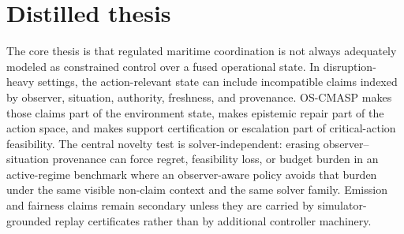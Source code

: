 \documentclass[11pt]{article}
\newcommand{\OSCMASP}{\mbox{\normalfont\textsc{OS-CMASP}}}
\newcommand{\1}{\mathbf{1}}
\theoremstyle{definition}
\theoremstyle{plain}
\theoremstyle{remark}
\begin{document}
\section*{Distilled thesis}
\label{app:distilled-thesis}

The core thesis is that regulated maritime coordination is not always adequately modeled as constrained control over a fused operational state. In disruption-heavy settings, the action-relevant state can include incompatible claims indexed by observer, situation, authority, freshness, and provenance. \OSCMASP{} makes those claims part of the environment state, makes epistemic repair part of the action space, and makes support certification or escalation part of critical-action feasibility. The central novelty test is solver-independent: erasing observer--situation provenance can force regret, feasibility loss, or budget burden in an active-regime benchmark where an observer-aware policy avoids that burden under the same visible non-claim context and the same solver family. Emission and fairness claims remain secondary unless they are carried by simulator-grounded replay certificates rather than by additional controller machinery.



\end{document}
